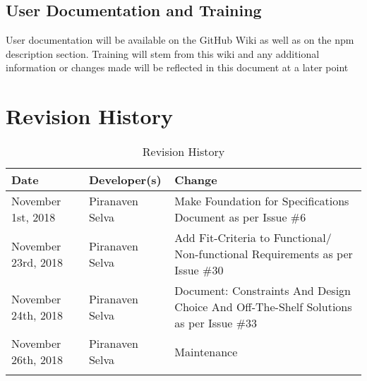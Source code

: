 \documentclass{article}
\begin{document}
\subsection{User Documentation and Training}

User documentation will be available on the GitHub Wiki as well as on the npm description section. 
\newline
Training will stem from this wiki and any additional information or changes made will be reflected in this document at a later point


\newpage
\section{Revision History}
\begin{table}[hp]
\caption{Revision History} \label{TblRevisionHistory}
\begin{tabularx}{\textwidth}{llX}
\toprule
\textbf{Date} & \textbf{Developer(s)} & \textbf{Change}\\
\midrule
November 1st, 2018 & Piranaven Selva & Make Foundation for Specifications Document as per Issue \#6 \\
November 23rd, 2018 & Piranaven Selva & Add Fit-Criteria to Functional/ Non-functional Requirements as per Issue \#30 \\
November 24th, 2018 & Piranaven Selva & Document: Constraints And Design Choice And Off-The-Shelf Solutions as per Issue \#33 \\
November 26th, 2018 & Piranaven Selva & Maintenance  \\
\\
\bottomrule
\end{tabularx}
\end{table}


\end{document}
